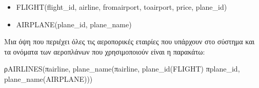 \begin{itemize}[noitemsep]
\item FLIGHT(flight\_id, airline, fromairport, toairport, price,
  plane\_id)
\item AIRPLANE(plane\_id, plane\_name) 
\end{itemize}

Μια όψη που περιέχει όλες τις αεροπορικές εταιρίες που υπάρχουν στο
σύστημα και τα ονόματα των αεροπλάνων που χρησιμοποιούν είναι η
παρακάτω:

ρAIRLINES(πairline, plane\_name(πairline, plane\_id(FLIGHT)
πplane\_id, plane\_name(AIRPLANE)))



